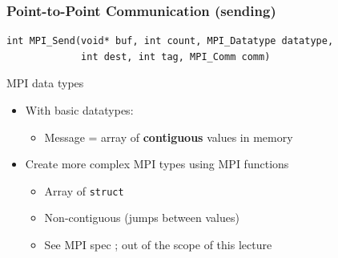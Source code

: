 \documentclass[xcolor={x11names,svgnames,psnames}]{beamer}
\begin{document}
\begin{frame}[fragile=singleslide]
  \frametitle{Point-to-Point Communication (sending)}

\begin{verbatim}
int MPI_Send(void* buf, int count, MPI_Datatype datatype,
             int dest, int tag, MPI_Comm comm)
\end{verbatim}

  \begin{alertblock}{MPI data types}
    \begin{itemize}
    \item With basic datatypes:
      \begin{itemize}
      \item Message = array of \textbf{contiguous} values in memory
      \end{itemize}

    \item Create more complex MPI types using MPI functions
      \begin{itemize}
      \item Array of \texttt{struct}
      \item Non-contiguous (jumps between values)
      \item See MPI spec ; out of the scope of this lecture
      \end{itemize}
    \end{itemize}
  \end{alertblock}
\end{frame}

\end{document}
